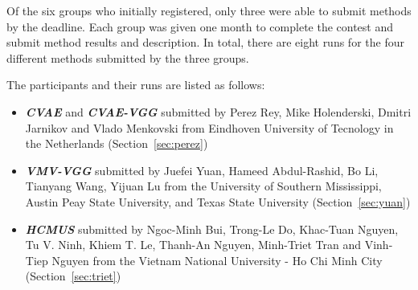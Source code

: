 \documentclass[../main.tex]{subfiles}
\begin{document}
Of the six groups who initially registered, only three were able to submit methods by the deadline. Each group was given one month to complete the contest and  submit method results and description. In total, there are eight runs for the four different methods submitted by the three groups. 

The participants and their runs are listed as follows:

\begin{itemize}
	
	\item  \textbf{\textit{CVAE}} and \textbf{\textit{CVAE-VGG}} submitted by Perez Rey, Mike Holenderski, Dmitri Jarnikov and Vlado Menkovski from Eindhoven University of Tecnology in the Netherlands (Section~\ref{sec:perez})
	
	\item  \textbf{\textit{VMV-VGG}} submitted by Juefei Yuan, Hameed Abdul-Rashid, Bo Li, Tianyang Wang, Yijuan Lu from the University of Southern Mississippi, Austin Peay State University, and Texas State University (Section~\ref{sec:yuan})
	
	\item  \textbf{\textit{HCMUS}} submitted by 
	Ngoc-Minh Bui, Trong-Le Do, Khac-Tuan Nguyen, Tu V. Ninh, Khiem T. Le, Thanh-An Nguyen, Minh-Triet Tran and Vinh-Tiep Nguyen from the Vietnam National University - Ho Chi Minh City (Section~\ref{sec:triet})

\end{itemize}
\end{document}
